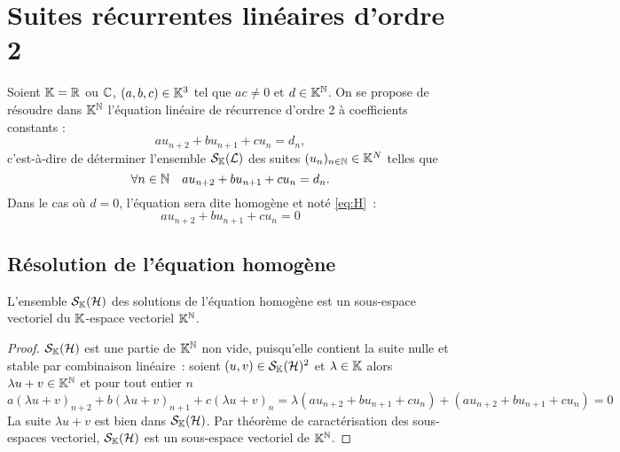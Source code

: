 \section{Suites récurrentes linéaires d'ordre 2}

Soient \(\mathbb{K}=\mathbb{R}\) ou \(\mathbb{C}\), \((a,b,c) \in \mathbb{K}^3\) tel que \(ac \neq 0\) et \(d
\in \mathbb{K}^{\mathbb{N}}\). On se propose de résoudre dans \(\mathbb{K}^{\mathbb{N}}\) l'équation linéaire de
récurrence d'ordre 2 à coefficients constants :
\begin{equation}
  au_{n+2}+bu_{n+1}+cu_n = d_n \label{eq:S} \tag{\(\Lb\)},
\end{equation}
c'est-à-dire de déterminer l'ensemble \(\mathcal{S}_{\mathbb{K}}(\mathcal{L})\) des suites \((u_n)_{n \in
\mathbb{N}} \in \mathbb{K}^N\) telles que
\begin{equation}
  \forall n \in \mathbb{N} \quad au_{n+2}+bu_{n+1}+cu_n = d_n.
\end{equation}
Dans le cas où \(d=0\), l'équation sera dite homogène et noté \eqref{eq:H}~:
\begin{equation}
  au_{n+2}+bu_{n+1}+cu_n = 0 \label{eq:H} \tag{\(\H\)}
\end{equation}

\subsection{Résolution de l'équation homogène}

\begin{prop}
  L'ensemble \(\mathcal{S}_{\mathbb{K}}(\mathcal{H})\) des solutions de l'équation homogène est un
  sous-espace vectoriel du \(\mathbb{K}\)-espace vectoriel \(\mathbb{K}^{\mathbb{N}}\).
\end{prop}
\begin{proof}
  \(\mathcal{S}_{\mathbb{K}}(\mathcal{H})\) est une partie de \(\mathbb{K}^{\mathbb{N}}\) non vide, puisqu'elle contient la
  suite nulle et stable par combinaison linéaire~:
  soient \((u,v) \in \mathcal{S}_{\mathbb{K}}(\mathcal{H})^2\) et \(\lambda \in \mathbb{K}\) alors \(\lambda u +v
  \in \mathbb{K}^{\mathbb{N}}\) et pour tout entier \(n\)
  \begin{equation}
    a(\lambda u+v)_{n+2} +b(\lambda u+v)_{n+1} +c(\lambda u+v)_n = \lambda
    (au_{n+2}+bu_{n+1}+cu_n) + (au_{n+2}+bu_{n+1}+cu_n)=0
  \end{equation}
  La suite \(\lambda u+v\) est bien dans \(\mathcal{S}_{\mathbb{K}}(\mathcal{H})\). Par théorème de
  caractérisation des sous-espaces vectoriel, \(\mathcal{S}_{\mathbb{K}}(\mathcal{H})\) est un sous-espace
  vectoriel de \(\mathbb{K}^{\mathbb{N}}\).
\end{proof}

